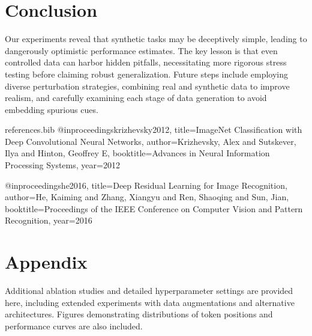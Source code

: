 \documentclass[11pt]{article}
\begin{document}
\section{Conclusion}
Our experiments reveal that synthetic tasks may be deceptively simple, leading to dangerously optimistic performance estimates. The key lesson is that even controlled data can harbor hidden pitfalls, necessitating more rigorous stress testing before claiming robust generalization. Future steps include employing diverse perturbation strategies, combining real and synthetic data to improve realism, and carefully examining each stage of data generation to avoid embedding spurious cues.

\clearpage

\begin{filecontents}{references.bib}
@inproceedings{krizhevsky2012,
  title={ImageNet Classification with Deep Convolutional Neural Networks},
  author={Krizhevsky, Alex and Sutskever, Ilya and Hinton, Geoffrey E},
  booktitle={Advances in Neural Information Processing Systems},
  year={2012}
}

@inproceedings{he2016,
  title={Deep Residual Learning for Image Recognition},
  author={He, Kaiming and Zhang, Xiangyu and Ren, Shaoqing and Sun, Jian},
  booktitle={Proceedings of the IEEE Conference on Computer Vision and Pattern Recognition},
  year={2016}
}
\end{filecontents}


\appendix
\section{Appendix}
Additional ablation studies and detailed hyperparameter settings are provided here, including extended experiments with data augmentations and alternative architectures. Figures demonstrating distributions of token positions and performance curves are also included.
\end{document}
